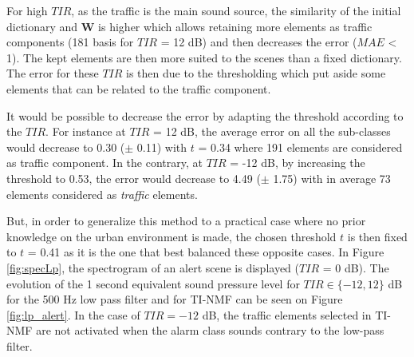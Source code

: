 \documentclass[twocolumn]{svjour3}          %
\begin{document}
For high $TIR$, as the traffic is the main sound source, the similarity of the initial dictionary and $\mathbf{W}$ is higher which allows retaining more elements as traffic components (181 basis for $TIR$ = 12 dB) and then decreases the error ($MAE$ < 1). The kept elements are then more suited to the scenes than a fixed dictionary. The error for these $TIR$ is then due to the thresholding which put aside some elements that can be related to the traffic component.

It would be possible to decrease the error by adapting the threshold according to the $TIR$. For instance at $TIR$ = 12 dB, the average error on all the sub-classes would decrease to 0.30 ($\pm$ 0.11) with $t$ = 0.34 where 191 elements are considered as traffic component. In the contrary, at $TIR$ = -12 dB, by increasing the threshold to 0.53, the error would decrease to 4.49 ($\pm$ 1.75) with in average 73 elements considered as \textit{traffic} elements.

But, in order to generalize this method to a practical case where no prior knowledge on the urban environment is made, the chosen threshold $t$ is then fixed to $t$ = 0.41 as it is the one that best balanced these opposite cases.
In Figure \ref{fig:specLp}, the spectrogram of an alert scene is displayed ($TIR$ = 0 dB). The evolution of the 1 second equivalent sound pressure level for $TIR \in \lbrace -12,12 \rbrace$ dB for the 500 Hz low pass filter and for TI-NMF can be seen on Figure \ref{fig:lp_alert}. In the case of $TIR=-12$ dB, the traffic elements selected in TI-NMF are not activated when the alarm class sounds contrary to the low-pass filter.
\end{document}
